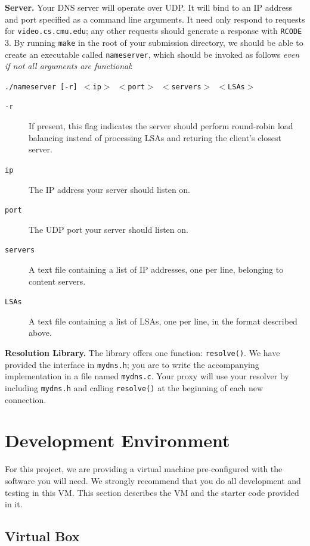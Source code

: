 \documentclass{article}
\newcommand{\theurl}{\texttt{video.cs.cmu.edu}}
\begin{document}
\bigskip \noindent \textbf{Server.} Your DNS server will operate over UDP. It
will bind to an IP address and port specified as a command line arguments. It
need only respond to requests for \theurl; any other requests should generate a
response with \texttt{RCODE} 3. By running \texttt{make} in the root of your
submission directory, we should be able to create an executable called
\texttt{nameserver}, which should be invoked as follows \emph{even if not all
arguments are functional}:
\begin{center}
	\texttt{./nameserver [-r] $<$ip$>$ $<$port$>$ $<$servers$>$ $<$LSAs$>$}
\end{center}

\begin{description}
	\item[\texttt{-r}] If present, this flag indicates the server should
	perform round-robin load balancing instead of processing LSAs and returing
	the client's closest server.
	\item[\texttt{ip}] The IP address your server should listen on.
	\item[\texttt{port}] The UDP port your server should listen on.
	\item[\texttt{servers}] A text file containing a list of IP addresses, one
	per line, belonging to content servers.
	\item[\texttt{LSAs}] A text file containing a list of LSAs, one per line,
	in the format described above.
\end{description}


\bigskip \noindent \textbf{Resolution Library.} The library offers one
function: \texttt{resolve()}. We have provided the interface in
\texttt{mydns.h}; you are to write the accompanying implementation in a file
named \texttt{mydns.c}. Your proxy will use your resolver by including
\texttt{mydns.h} and calling \texttt{resolve()} at the beginning of each new
connection.


\section{Development Environment}
\label{sec:starter}

For this project, we are providing a virtual machine pre-configured with the
software you will need. We strongly recommend that you do all development and
testing in this VM. This section describes the VM and the starter code provided
in it.

\subsection{Virtual Box}
\end{document}
